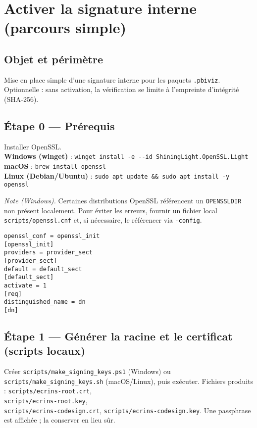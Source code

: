 \section{Activer la signature interne (parcours simple)}
\label{ann:signature-procedure}

\subsection*{Objet et périmètre}
Mise en place simple d’une signature interne pour les paquets \texttt{.pbiviz}. Optionnelle : sans activation, la vérification se limite à l’empreinte d’intégrité (SHA-256).

\subsection*{Étape 0 — Prérequis}
Installer OpenSSL.\\
\textbf{Windows (winget)} : \verb|winget install -e --id ShiningLight.OpenSSL.Light|\\
\textbf{macOS} : \verb|brew install openssl| \quad \\
\textbf{Linux (Debian/Ubuntu)} : \verb|sudo apt update && sudo apt install -y openssl|

\noindent\textit{Note (Windows).} Certaines distributions OpenSSL référencent un \texttt{OPENSSLDIR} non présent localement. Pour éviter les erreurs, fournir un fichier local \texttt{scripts/openssl.cnf} et, si nécessaire, le référencer via \texttt{-config}.

\begin{lstlisting}[basicstyle=\ttfamily\small]
openssl_conf = openssl_init
[openssl_init]
providers = provider_sect
[provider_sect]
default = default_sect
[default_sect]
activate = 1
[req]
distinguished_name = dn
[dn]
\end{lstlisting}

\subsection*{Étape 1 — Générer la racine et le certificat (scripts locaux)}
Créer \texttt{scripts/make\_signing\_keys.ps1} (Windows) ou \texttt{scripts/make\_signing\_keys.sh} (macOS/Linux), puis exécuter. Fichiers produits : \texttt{scripts/ecrins-root.crt},\\\texttt{scripts/ecrins-root.key}, \\\texttt{scripts/ecrins-codesign.crt}, \texttt{scripts/ecrins-codesign.key}. Une passphrase est affichée ; la conserver en lieu sûr.

